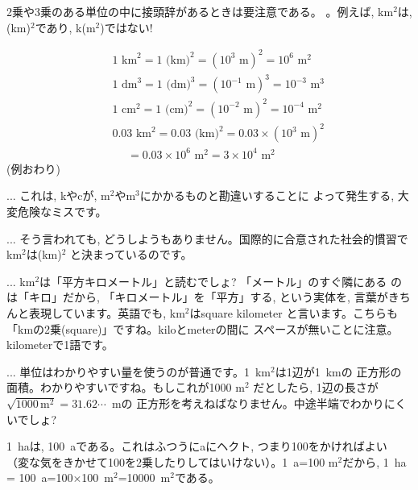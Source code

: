 2乗や3乗のある単位の中に接頭辞があるときは要注意である。
。例えば, km$^2$は, (km)$^2$であり, k(m$^2$)ではない! 
\begin{exmpl}
\begin{eqnarray}
&&1\text{ km}^2=1\text{ (km)}^2 = (10^3\text{ m})^2=10^6\text{ m}^2\label{eq:unit_km2}\\
&&1\text{ dm}^3=1\text{ (dm)}^3 = (10^{-1}\text{ m})^3=10^{-3}\text{ m}^3\label{eq:unit_dm3}\\
&&1\text{ cm}^2=1\text{ (cm)}^2 = (10^{-2}\text{ m})^2=10^{-4}\text{ m}^2\label{eq:unit_cm2}\\
&&0.03\text{ km}^2=0.03\text{ (km)}^2 = 0.03\times(10^3\text{ m})^2\nonumber\\
&&\,\,\,\,\,\,\,\,=0.03\times10^6\text{ m}^2
=3\times10^4\text{ m}^2
\end{eqnarray}
(例おわり)\end{exmpl}

\begin{freqmiss}{\small{} ... これは, kやcが, m$^2$やm$^3$にかかるものと勘違いすることに
よって発生する, 大変危険なミスです。}
\end{freqmiss}

\begin{faq}{\small{}... そう言われても, 
どうしようもありません。国際的に合意された社会的慣習でkm$^2$は(km)$^2$
と決まっているのです。}

{\small{}... 
km$^2$は「平方キロメートル」と読むでしょ? 「メートル」のすぐ隣にある
のは「キロ」だから, 「キロメートル」を「平方」する, という実体を, 
言葉がきちんと表現しています。英語でも, km$^2$はsquare kilometer
と言います。こちらも「kmの2乗(square)」ですね。kiloとmeterの間に
スペースが無いことに注意。kilometerで1語です。}

{\small{}... 
単位はわかりやすい量を使うのが普通です。1~km$^2$は1辺が1~kmの
正方形の面積。わかりやすいですね。もしこれが1000 m$^2$
だとしたら, 1辺の長さが$\sqrt{1000\,\text{m}^2}=31.62\cdots$~mの
正方形を考えねばなりません。中途半端でわかりにくいでしょ?
}\end{faq}

1~haは, 100~aである。これはふつうにaにヘクト, つまり100をかければよい
（変な気をきかせて100を2乗したりしてはいけない）。1~a=100 m$^2$だから, 
1~ha = 100~a=100$\times$100~m$^2$=10000~m$^2$である。

